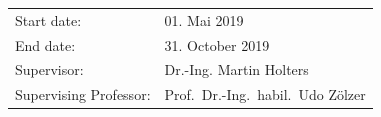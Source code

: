 \begin{titlepage}
\begin{center}
        \vfill
        \begin{tabular}{ll}
            Start date:            & 01. Mai 2019                       \\
            End date:              & 31. October 2019                   \\
            Supervisor:            & Dr.-Ing. Martin Holters            \\
            Supervising Professor: & Prof.~Dr.-Ing.~habil.~Udo Z\"olzer \\
        \end{tabular}
    \end{center}
    \vspace{2cm}

\end{titlepage}

